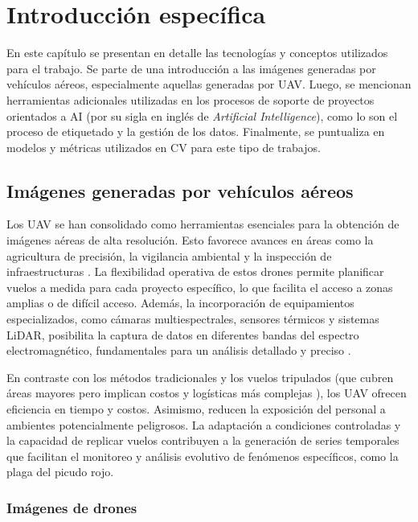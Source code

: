 \chapter{Introducción específica}
\label{Chapter2}

En este capítulo se presentan en detalle las tecnologías y conceptos utilizados para el trabajo. Se parte de una introducción a las imágenes generadas por vehículos aéreos, especialmente aquellas generadas por UAV. Luego, se mencionan herramientas adicionales utilizadas en los procesos de soporte de proyectos orientados a AI (por su sigla en inglés de \textit{Artificial Intelligence}), como lo son el proceso de etiquetado y la gestión de los datos. Finalmente, se puntualiza en modelos y métricas utilizados en CV para este tipo de trabajos.

\section{Imágenes generadas por vehículos aéreos}
\label{sec:imgGenVehiculosAereos}

Los UAV se han consolidado como herramientas esenciales para la obtención de imágenes aéreas de alta resolución. Esto favorece avances en áreas como la agricultura de precisión, la vigilancia ambiental y la inspección de infraestructuras \citep{mokhtar_image_2023}. La flexibilidad operativa de estos drones permite planificar vuelos a medida para cada proyecto específico, lo que facilita el acceso a zonas amplias o de difícil acceso. Además, la incorporación de equipamientos especializados, como cámaras multiespectrales, sensores térmicos y sistemas LiDAR, posibilita la captura de datos en diferentes bandas del espectro electromagnético, fundamentales para un análisis detallado y preciso \citep{unmanned_system_technology_uavdrone_nodate}.

En contraste con los métodos tradicionales y los vuelos tripulados (que cubren áreas mayores pero implican costos y logísticas más complejas \citep{2000_aviation_ortoimagenes_nodate}), los UAV ofrecen eficiencia en tiempo y costos. Asimismo, reducen la exposición del personal a ambientes potencialmente peligrosos. La adaptación a condiciones controladas y la capacidad de replicar vuelos contribuyen a la generación de series temporales que facilitan el monitoreo y análisis evolutivo de fenómenos específicos, como la plaga del picudo rojo.

\subsection{Imágenes de drones}
\label{sec:imgUavDrones}

